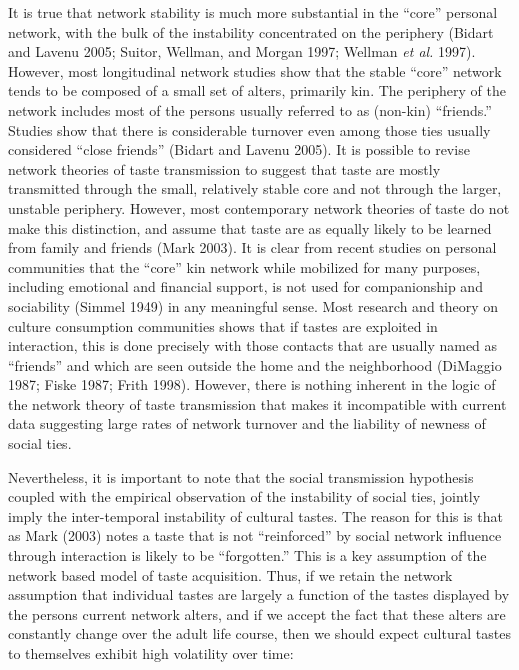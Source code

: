 It is true that network stability is much more substantial in the ``core'' personal network, with the bulk of the instability concentrated on the periphery (Bidart and Lavenu 2005; Suitor, Wellman, and Morgan 1997; Wellman \emph{et al.} 1997). However, most longitudinal network studies show that the stable ``core'' network tends to be composed of a small set of alters, primarily kin. The periphery of the network includes most of the persons usually referred to as (non-kin) ``friends.'' Studies show that there is considerable turnover even among those ties usually considered ``close friends'' (Bidart and Lavenu 2005). It is possible to revise network theories of taste transmission to suggest that taste are mostly transmitted through the small, relatively stable core and not through the larger, unstable periphery. However, most contemporary network theories of taste do not make this distinction, and assume that taste are as equally likely to be learned from family and friends (Mark 2003). It is clear from recent studies on personal communities that the ``core'' kin network while mobilized for many purposes, including emotional and financial support, is not used for companionship and sociability (Simmel 1949) in any meaningful sense. Most research and theory on culture consumption communities shows that if tastes are exploited in interaction, this is done precisely with those contacts that are usually named as ``friends'' and which are seen outside the home and the neighborhood (DiMaggio 1987; Fiske 1987; Frith 1998). However, there is nothing inherent in the logic of the network theory of taste transmission that makes it incompatible with current data suggesting large rates of network turnover and the liability of newness of social ties.

Nevertheless, it is important to note that the social transmission hypothesis coupled with the empirical observation of the instability of social ties, jointly imply the inter-temporal instability of cultural tastes. The reason for this is that as Mark (2003) notes a taste that is not ``reinforced'' by social network influence through interaction is likely to be ``forgotten.'' This is a key assumption of the network based model of taste acquisition. Thus, if we retain the network assumption that individual tastes are largely a function of the tastes displayed by the persons current network alters, and if we accept the fact that these alters are constantly change over the adult life course, then we should expect cultural tastes to themselves exhibit high volatility over time:

